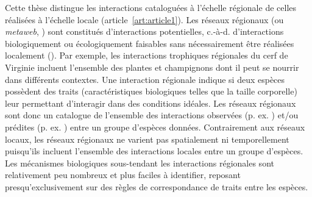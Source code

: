 Cette thèse distingue les interactions cataloguées à l'échelle régionale de
celles réalisées à l'échelle locale (article~\ref{art:article1}). Les réseaux
régionaux (ou \textit{metaweb}, \cite{Pascual2006Ecological}) sont constitués
d'interactions potentielles, c.-à-d. d'interactions biologiquement ou
écologiquement faisables sans nécessairement être réalisées localement
(\cite{Tylianakis2017Ecological}). Par exemple, les interactions trophiques
régionales du cerf de Virginie incluent l'ensemble des plantes et champignons
dont il peut se nourrir dans différents contextes. Une interaction régionale
indique si deux espèces possèdent des traits (caractéristiques biologiques
telles que la taille corporelle) leur permettant d'interagir dans des conditions
idéales. Les réseaux régionaux sont donc un catalogue de l'ensemble des
interactions observées (p. ex. \cite{Maiorano2020Tetraeu}) et/ou prédites (p.
ex. \cite{Strydom2022Food}) entre un groupe d'espèces données. Contrairement aux
réseaux locaux, les réseaux régionaux ne varient pas spatialement ni
temporellement puisqu'ils incluent l'ensemble des interactions locales entre un
groupe d'espèces. Les mécanismes biologiques sous-tendant les interactions
régionales sont relativement peu nombreux et plus faciles à identifier, reposant
presqu'exclusivement sur des règles de correspondance de traits entre les
espèces. 

